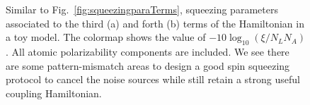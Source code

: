 \begin{figure}[!tbp]
\begin{minipage}{.91\linewidth}
\centering
{}
\end{minipage}
\par\medskip
\begin{minipage}{.91\linewidth}
\centering
{}
\end{minipage}
\caption[Squeezing parameters as a function of detuning and atom position with a full atomic polarizability.]{Similar to Fig.~\ref{fig:squeezingparaTerms}, squeezing parameters associated to the third (a) and forth (b) terms of the Hamiltonian in a toy model. The 
colormap shows the value of $ -10\log_{10}(\xi/N_LN_A) $.  All atomic polarizability components are included. We see there are some pattern-mismatch areas to design a good spin squeezing protocol to cancel the noise sources while still retain a strong useful coupling Hamiltonian.}
\label{fig:squeezingparaTerms_total}
\end{figure}

